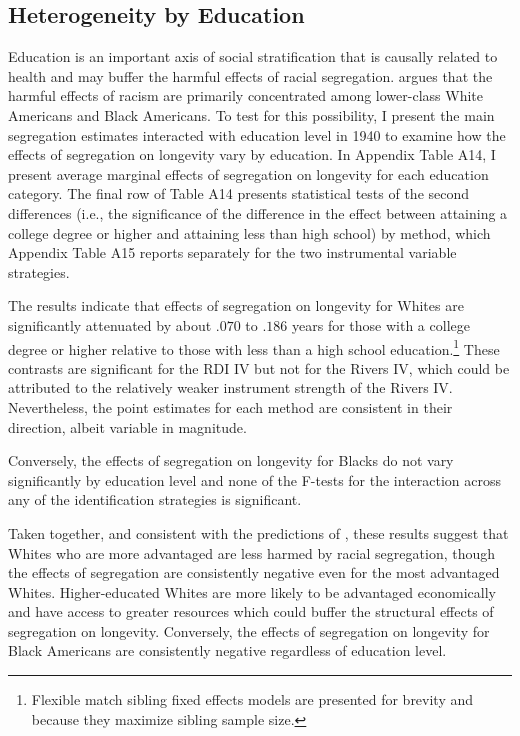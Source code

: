 \documentclass[11pt]{article}
\begin{document}
\subsection{Heterogeneity by Education}
\label{sec:append_ed}
Education is an important axis of social stratification that is causally related to health and may buffer the harmful effects of racial segregation. \citet{dubois_black_1935} argues that the harmful effects of racism are primarily concentrated among lower-class White Americans and Black Americans. To test for this possibility, I present the main segregation estimates interacted with education level in 1940 to examine how the effects of segregation on longevity vary by education. In Appendix Table A14, I present average marginal effects of segregation on longevity for each education category. The final row of Table A14 presents statistical tests of the second differences (i.e., the significance of the difference in the effect between attaining a college degree or higher and attaining less than high school) by method, which Appendix Table A15 reports separately for the two instrumental variable strategies. 

\begin{landscape}
\small 
\end{landscape}

The results indicate that effects of segregation on longevity for Whites are significantly attenuated by about $.070$ to $.186$ years for those with a college degree or higher relative to those with less than a high school education.\footnote{Flexible match sibling fixed effects models are presented for brevity and because they maximize sibling sample size.} These contrasts are significant for the RDI IV but not for the Rivers IV, which could be attributed to the relatively weaker instrument strength of the Rivers IV. Nevertheless, the point estimates for each method are consistent in their direction, albeit variable in magnitude.

Conversely, the effects of segregation on longevity for Blacks do not vary significantly by education level and none of the F-tests for the interaction across any of the identification strategies is significant.

Taken together, and consistent with the predictions of \citet{dubois_black_1935}, these results suggest that Whites who are more advantaged are less harmed by racial segregation, though the effects of segregation are consistently negative even for the most advantaged Whites. Higher-educated Whites are more likely to be advantaged economically and have access to greater resources which could buffer the structural effects of segregation on longevity. Conversely, the effects of segregation on longevity for Black Americans are consistently negative regardless of education level.  
\end{document}
